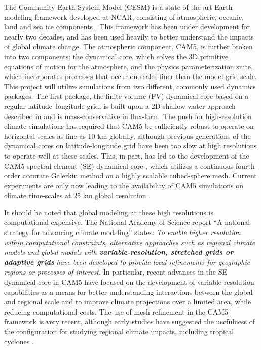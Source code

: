 \documentclass[11pt]{article}
\begin{document}
The Community Earth-System Model (CESM) is a state-of-the-art Earth modeling framework developed at NCAR, consisting of atmospheric, oceanic, land and sea ice components  \citep{RBNetal2010NCAR}.  This framework has been under development for nearly two decades, and has been used heavily to better understand the impacts of global climate change.  The atmospheric component, CAM5, is further broken into two components: the dynamical core, which solves the 3D primitive equations of motion for the atmosphere, and the physics parameterization suite, which incorporates processes that occur on scales finer than the model grid scale. This project will utilize simulations from two different, commonly used dynamics packages. The first package, the finite-volume (FV) dynamical core based on a regular latitude--longitude grid, is built upon a 2D shallow water approach described in \citet{Lin1996,Lin1997} and is mass-conservative in flux-form. The push for high-resolution climate simulations has required that CAM5 be sufficiently robust to operate on horizontal scales as fine as 10 km globally, although previous generations of the dynamical cores on latitude-longitude grid have been too slow at high resolutions to operate well at these scales.  This, in part, has led to the development of the CAM5 spectral element (SE) dynamical core \citep{dennis2012cam}, which utilizes a continuous fourth-order accurate Galerkin method on a highly scalable cubed-sphere mesh.  Current experiments are only now leading to the availability of CAM5 simulations on climate time-scales at 25 km global resolution \citep{Bacmeister2014, Wehner2014, Wehner2015, Reed2015b}.

It should be noted that global modeling at these high resolutions is computational expensive.  The National Academy of Science report ``A national strategy for advancing climate modeling'' states: \textit{To enable higher resolution within computational constraints, alternative approaches such as regional climate models and global models with \textbf{variable-resolution, stretched grids or adaptive grids} have been developed to provide local refinements for geographic regions or processes of interest.}  In particular, recent advances in the SE dynamical core in CAM5 have focused on the development of variable-resolution capabilities as a means for better understanding interactions between the global and regional scale and to improve climate projections over a limited area, while reducing computational costs. The use of mesh refinement in the CAM5 framework is very recent, although early studies have suggested the usefulness of the configuration for studying regional climate impacts, including tropical cyclones \citep{Zarzycki2014multidecadal, Zarzycki2015clim}.
\end{document}
